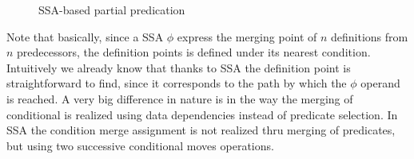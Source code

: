 \begin{figure}
\centering
\caption{SSA-based partial predication}
\label{fig:nest_ssa}
\end{figure}

Note that basically, since a SSA $\phi$ express the merging point of $n$ definitions from $n$ predecessors, the definition points is defined under its nearest condition. Intuitively we already know that thanks to SSA the definition point is straightforward to find, since it corresponds to the path by which the $\phi$ operand is reached. 
A very big difference in nature is in the way the merging of conditional is realized using data dependencies instead of predicate selection. In SSA the condition merge assignment is not realized thru merging of predicates, but using two successive conditional moves operations.

